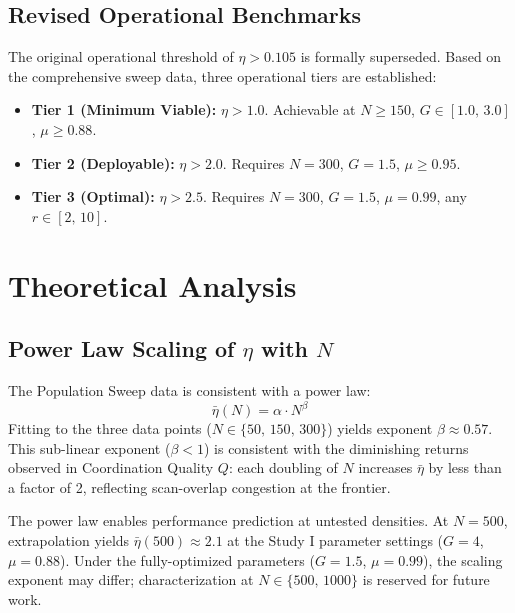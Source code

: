 \documentclass[journal,compsoc]{IEEEtran}
\begin{document}
\subsection{Revised Operational Benchmarks}

The original operational threshold of $\eta>0.105$ is formally superseded. Based on
the comprehensive sweep data, three operational tiers are established:

\begin{itemize}
    \item \textbf{Tier 1 (Minimum Viable):} $\eta>1.0$. Achievable at $N\geq150$,
          $G\in[1.0,\,3.0]$, $\mu\geq0.88$.
    \item \textbf{Tier 2 (Deployable):} $\eta>2.0$. Requires $N=300$, $G=1.5$,
          $\mu\geq0.95$.
    \item \textbf{Tier 3 (Optimal):} $\eta>2.5$. Requires $N=300$, $G=1.5$,
          $\mu=0.99$, any $r\in[2,\,10]$.
\end{itemize}

\section{Theoretical Analysis}
\label{sec:theory}

\subsection{Power Law Scaling of $\eta$ with $N$}

The Population Sweep data is consistent with a power law:
\begin{equation}
    \bar{\eta}(N) = \alpha \cdot N^\beta
    \label{eq:powerlaw}
\end{equation}
Fitting to the three data points ($N\in\{50,\,150,\,300\}$) yields exponent
$\beta \approx 0.57$. This sub-linear exponent ($\beta < 1$) is consistent with
the diminishing returns observed in Coordination Quality $Q$: each doubling of $N$
increases $\bar{\eta}$ by less than a factor of 2, reflecting scan-overlap congestion
at the frontier.

The power law enables performance prediction at untested densities. At $N=500$,
extrapolation yields $\bar{\eta}(500) \approx 2.1$ at the Study I parameter settings
($G=4$, $\mu=0.88$). Under the fully-optimized parameters ($G=1.5$, $\mu=0.99$),
the scaling exponent may differ; characterization at $N\in\{500,\,1000\}$ is reserved
for future work.
\end{document}
